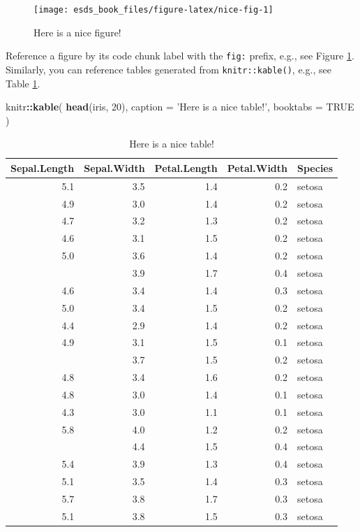 \documentclass[
]{book}
\newenvironment{Shaded}{\begin{snugshade}}{\end{snugshade}}
\newcommand{\DataTypeTok}[1]{\textcolor[rgb]{0.13,0.29,0.53}{#1}}
\newcommand{\DecValTok}[1]{\textcolor[rgb]{0.00,0.00,0.81}{#1}}
\newcommand{\KeywordTok}[1]{\textcolor[rgb]{0.13,0.29,0.53}{\textbf{#1}}}
\newcommand{\NormalTok}[1]{#1}
\newcommand{\OperatorTok}[1]{\textcolor[rgb]{0.81,0.36,0.00}{\textbf{#1}}}
\newcommand{\OtherTok}[1]{\textcolor[rgb]{0.56,0.35,0.01}{#1}}
\newcommand{\StringTok}[1]{\textcolor[rgb]{0.31,0.60,0.02}{#1}}
\begin{document}
\begin{figure}

{\centering \texttt{[image: esds\_book\_files/figure-latex/nice-fig-1]} 

}

\caption{Here is a nice figure!}\label{fig:nice-fig}
\end{figure}

Reference a figure by its code chunk label with the \texttt{fig:} prefix, e.g., see Figure \ref{fig:nice-fig}. Similarly, you can reference tables generated from \texttt{knitr::kable()}, e.g., see Table \ref{tab:nice-tab}.

\begin{Shaded}
\begin{Highlighting}[]
\NormalTok{knitr}\OperatorTok{::}\KeywordTok{kable}\NormalTok{(}
  \KeywordTok{head}\NormalTok{(iris, }\DecValTok{20}\NormalTok{), }\DataTypeTok{caption =} \StringTok{'Here is a nice table!'}\NormalTok{,}
  \DataTypeTok{booktabs =} \OtherTok{TRUE}
\NormalTok{)}
\end{Highlighting}
\end{Shaded}

\begin{table}

\caption{\label{tab:nice-tab}Here is a nice table!}
\centering
\begin{tabular}[t]{rrrrl}
\toprule
Sepal.Length & Sepal.Width & Petal.Length & Petal.Width & Species\\
\midrule
5.1 & 3.5 & 1.4 & 0.2 & setosa\\
4.9 & 3.0 & 1.4 & 0.2 & setosa\\
4.7 & 3.2 & 1.3 & 0.2 & setosa\\
4.6 & 3.1 & 1.5 & 0.2 & setosa\\
5.0 & 3.6 & 1.4 & 0.2 & setosa\\
\addlinespace
5.4 & 3.9 & 1.7 & 0.4 & setosa\\
4.6 & 3.4 & 1.4 & 0.3 & setosa\\
5.0 & 3.4 & 1.5 & 0.2 & setosa\\
4.4 & 2.9 & 1.4 & 0.2 & setosa\\
4.9 & 3.1 & 1.5 & 0.1 & setosa\\
\addlinespace
5.4 & 3.7 & 1.5 & 0.2 & setosa\\
4.8 & 3.4 & 1.6 & 0.2 & setosa\\
4.8 & 3.0 & 1.4 & 0.1 & setosa\\
4.3 & 3.0 & 1.1 & 0.1 & setosa\\
5.8 & 4.0 & 1.2 & 0.2 & setosa\\
\addlinespace
5.7 & 4.4 & 1.5 & 0.4 & setosa\\
5.4 & 3.9 & 1.3 & 0.4 & setosa\\
5.1 & 3.5 & 1.4 & 0.3 & setosa\\
5.7 & 3.8 & 1.7 & 0.3 & setosa\\
5.1 & 3.8 & 1.5 & 0.3 & setosa\\
\bottomrule
\end{tabular}
\end{table}
\end{document}
